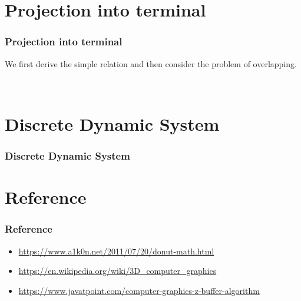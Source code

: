 \documentclass[12pt, t]{beamer}
\newcommand{\nullspace}{~\\[15pt]}
\begin{document}

\section{Projection into terminal}
\begin{frame}
    \frametitle{Projection into terminal}

    We first derive the simple relation and then consider the problem of overlapping.

    \nullspace
    

\end{frame}


\section{Discrete Dynamic System}
\begin{frame}
    \frametitle{Discrete Dynamic System}

\end{frame}


\section{Reference}
\begin{frame}
    \frametitle{Reference}

    \small{
        \begin{itemize}
            \item \url{https://www.a1k0n.net/2011/07/20/donut-math.html}
            \item \url{https://en.wikipedia.org/wiki/3D_computer_graphics}
            \item \url{https://www.javatpoint.com/computer-graphics-z-buffer-algorithm}
        \end{itemize}
    }
    
\end{frame}
\end{document}
